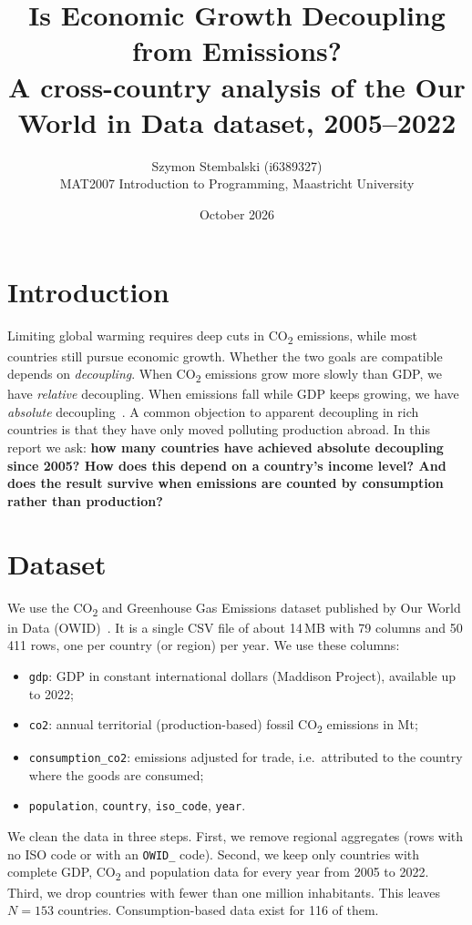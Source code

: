 \documentclass[10pt,a4paper]{article}
\title{\vspace{-1.5cm}Is Economic Growth Decoupling from \COtwo{} Emissions?\\
\large A cross-country analysis of the Our World in Data \COtwo{} dataset, 2005--2022}
\author{Szymon Stembalski (i6389327) \\ \small MAT2007 Introduction to Programming, Maastricht University}
\date{October 2026}
\newcommand{\COtwo}{CO\textsubscript{2}\xspace}
\begin{document}
\maketitle
\vspace{-0.8cm}

\section*{Introduction}
Limiting global warming requires deep cuts in \COtwo{} emissions, while most
countries still pursue economic growth. Whether the two goals are compatible
depends on \emph{decoupling}. When \COtwo{} emissions grow more slowly than GDP,
we have \emph{relative} decoupling. When emissions fall while GDP keeps growing,
we have \emph{absolute} decoupling~\cite{ipcc}. A common objection to apparent
decoupling in rich countries is that they have only moved polluting production
abroad. In this report we ask: \textbf{how many countries have achieved absolute
decoupling since 2005? How does this depend on a country's income level? And does
the result survive when emissions are counted by consumption rather than
production?}

\section*{Dataset}
We use the \COtwo{} and Greenhouse Gas Emissions dataset published by Our World
in Data (OWID)~\cite{owid}. It is a single CSV file of about 14\,MB with 79
columns and 50\,411 rows, one per country (or region) per year. We use these
columns:
\begin{itemize}\setlength\itemsep{0em}
  \item \texttt{gdp}: GDP in constant international dollars (Maddison Project), available up to 2022;
  \item \texttt{co2}: annual territorial (production-based) fossil \COtwo{} emissions in Mt;
  \item \texttt{consumption\_co2}: emissions adjusted for trade, i.e.\ attributed to the country where the goods are consumed;
  \item \texttt{population}, \texttt{country}, \texttt{iso\_code}, \texttt{year}.
\end{itemize}
We clean the data in three steps. First, we remove regional aggregates
(rows with no ISO code or with an \texttt{OWID\_} code). Second, we keep only
countries with complete GDP, \COtwo{} and population data for every year from
2005 to 2022. Third, we drop countries with fewer than one million inhabitants.
This leaves $N=153$ countries. Consumption-based data exist for 116 of them.
\end{document}
